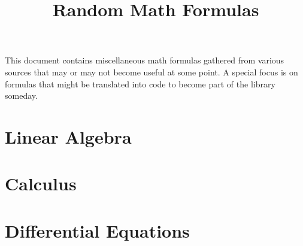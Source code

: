 \documentclass[12pt]{article}
\begin{document}
	
\parindent=0in
\parskip=0pt
		
 \setcounter{page}{1}

\title{Random Math Formulas}
\maketitle

\section{}
This document contains miscellaneous math formulas gathered from various sources that may or may not become useful at some point. A special focus is on formulas that might be translated into code to become part of the library someday.

\tableofcontents



\section{Linear Algebra}

\section{Calculus}

\section{Differential Equations}


	
\end{document}
